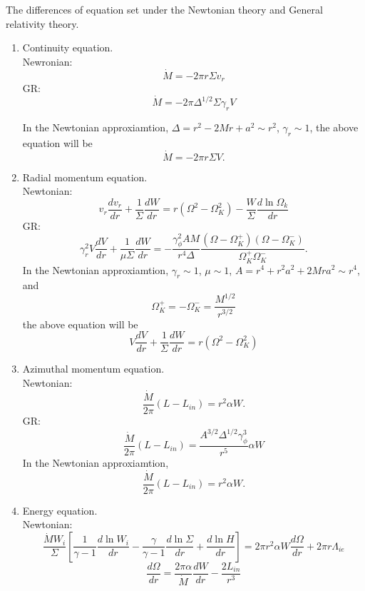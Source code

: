 \documentclass[12pt]{book}
\begin{document}
The differences of equation set under the Newtonian theory and General relativity theory. 
\begin{enumerate}
 \item Continuity equation.\\
Newronian:
\begin{equation}
\dot M=-2\pi r \Sigma v_r
\end{equation}
GR:\\
\begin{equation}
 \dot M=-2\pi \Delta^{1/2} \Sigma\gamma_r V
\end{equation}

In the Newtonian approxiamtion, $\Delta=r^2-2Mr+a^2\sim r^2$, $\gamma_r\sim 1$, the above equation will be
\begin{equation}
\dot M=-2\pi r\Sigma V.
\end{equation}
\item Radial momentum equation.\\
Newtonian:
\begin{equation}
v_r\frac{dv_r}{dr}+\frac{1}{\Sigma}\frac{dW}{dr}=r(\Omega^2-\Omega_K^2)-\frac{W}{\Sigma}\frac{d\ln\Omega_k}{dr}
\end{equation}
GR:
\begin{equation}
\gamma_r^2V\frac{dV}{dr}+\frac{1}{\mu\Sigma}\frac{dW}{dr}=-\frac{\gamma_\phi^2AM}{r^4\Delta}
\frac{(\Omega-\Omega_K^+)(\Omega-\Omega_K^-)}{\Omega_K^+\Omega_K^-}.
\end{equation}
In the Newtonian approxiamtion, $\gamma_r\sim 1$, $\mu\sim 1$, $A=r^4+r^2a^2+2Mra^2\sim r^4$, and 
\begin{equation}
\Omega_K^+=-\Omega_K^-=\frac{M^{1/2}}{r^{3/2}}
\end{equation}
the above equation will
be
\begin{equation}
V\frac{dV}{dr}+\frac{1}{\Sigma}\frac{dW}{dr}=r(\Omega^2-\Omega_K^2)
\end{equation}
\item Azimuthal momentum equation.\\
Newtonian:
\begin{equation}
\frac{\dot M}{2\pi}(L-L_{in})=r^2\alpha W.
\end{equation}
GR:
\begin{equation}
\frac{\dot M}{2\pi}(L-L_{in})=\frac{A^{3/2}\Delta^{1/2}\gamma_\phi^3}{r^5}\alpha W
\end{equation}
In the Newtonian approxiamtion,
\begin{equation}
\frac{\dot M}{2\pi}(L-L_{in})=r^2\alpha W.
\end{equation}
\item Energy equation.\\
Newtonian:
\begin{equation}
\frac{\dot M W_i}{\Sigma}\left[\frac{1}{\gamma-1}\frac{d\ln W_i}{dr}
-\frac{\gamma}{\gamma-1}\frac{d\ln\Sigma}{dr}+\frac{d\ln H}{dr}\right]
=2\pi r^2\alpha W\frac{d\Omega}{dr}+2\pi r\Lambda_{ie}
\end{equation}
\begin{equation}
 \frac{d\Omega}{dr}=\frac{2\pi \alpha}{\dot M}\frac{dW}{dr}-\frac{2L_{in}}{r^3}
\end{equation}


\end{enumerate}
\end{document}
